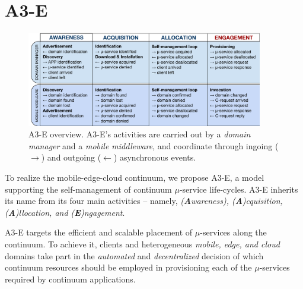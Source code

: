 \section{A3-E}\label{sec:A3-E}

\begin{figure}[tbp]
	\includegraphics[width=0.92\textwidth]{figs/A3-E-process}
	\caption{A3-E overview. A3-E's activities are carried out by a \textit{domain manager} and a \textit{mobile middleware}, and coordinate through ingoing ($\rightarrow$) and outgoing ($\leftarrow$) asynchronous events.}
	\label{fig:A3-E-process}
\end{figure}


To realize the mobile-edge-cloud continuum, we propose A3-E, a model supporting the self-management of continuum $\mu$-service life-cycles. A3-E inherits its name from its four main activities -- namely, \textit{(\textbf{A}wareness), (\textbf{A})cquisition, (\textbf{A})llocation, and (\textbf{E})ngagement}. 


A3-E targets 
the efficient and scalable placement of $\mu$-services along the continuum. 
To achieve it, clients and heterogeneous \textit{mobile, edge, and cloud} domains take part in the \textit{automated} and \textit{decentralized} decision of which continuum resources should be employed in provisioning each of the $\mu$-services required by continuum applications.%



